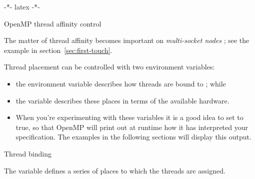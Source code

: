  -*- latex -*-


 {OpenMP thread affinity control}
\label{sec:omp-proc-bind}

The matter of thread affinity becomes important on \emph{multi-socket nodes}%
;
see the example in section~\ref{sec:first-touch}.

Thread placement can be controlled with two environment variables:
\begin{itemize}
\item the environment variable 
  describes how threads are bound to ; while
\item the variable  describes these places
  in terms of the available hardware.
\item When you're experimenting with these variables it is a good idea
  to set  to true, so that OpenMP will
  print out at runtime how it has interpreted your specification.
  The examples in the following sections will display this output.
\end{itemize}

 {Thread binding}
\label{omp:threadbind}

The variable  defines a series of places to
which the threads are assigned.

